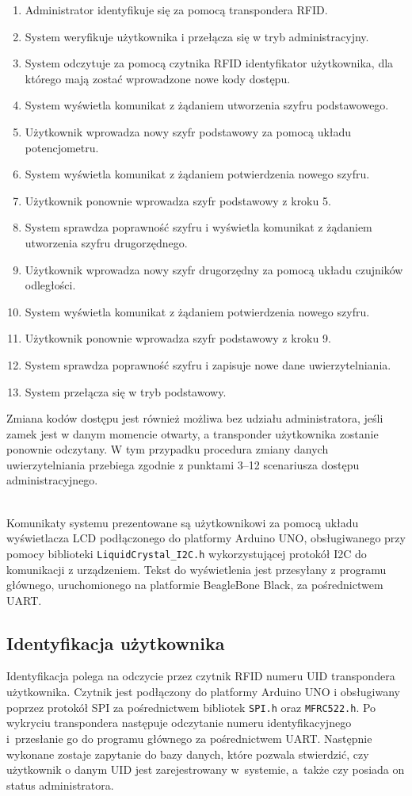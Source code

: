 \documentclass[polish,polish,a4paper]{article}
\begin{document}
	\begin{enumerate}
		\setlength\itemsep{-0.2em}
		\item Administrator identyfikuje się za pomocą transpondera RFID.
		\item System weryfikuje użytkownika i przełącza się w tryb administracyjny.
		\item System odczytuje za pomocą czytnika RFID identyfikator użytkownika, dla którego mają zostać wprowadzone nowe kody dostępu.
		\item System wyświetla komunikat z żądaniem utworzenia szyfru podstawowego.
		\item Użytkownik wprowadza nowy szyfr podstawowy za pomocą układu potencjometru.
		\item System wyświetla komunikat z żądaniem potwierdzenia nowego szyfru.
		\item Użytkownik ponownie wprowadza szyfr podstawowy z kroku 5.
		\item System sprawdza poprawność szyfru i wyświetla komunikat z żądaniem utworzenia szyfru drugorzędnego.
		\item Użytkownik wprowadza nowy szyfr drugorzędny za pomocą układu czujników odległości.
		\item System wyświetla komunikat z żądaniem potwierdzenia nowego szyfru.
		\item Użytkownik ponownie wprowadza szyfr podstawowy z kroku 9.
		\item System sprawdza poprawność szyfru i zapisuje nowe dane uwierzytelniania.
		\item System przełącza się w tryb podstawowy.
	\end{enumerate}
	Zmiana kodów dostępu jest również możliwa bez udziału administratora, jeśli zamek jest w danym momencie otwarty, a transponder użytkownika zostanie ponownie odczytany. W tym przypadku procedura zmiany danych uwierzytelniania przebiega zgodnie z punktami 3--12 scenariusza dostępu administracyjnego.
	
	\noindent\\
	Komunikaty systemu prezentowane są użytkownikowi za pomocą układu wyświetlacza LCD podłączonego do platformy Arduino UNO, obsługiwanego przy pomocy biblioteki \verb|LiquidCrystal_I2C.h| wykorzystującej protokół I2C do komunikacji z urządzeniem. Tekst do wyświetlenia jest przesyłany z programu głównego, uruchomionego na platformie BeagleBone Black, za pośrednictwem UART.
	
	\subsection{Identyfikacja użytkownika}
	Identyfikacja polega na odczycie przez czytnik RFID numeru UID transpondera użytkownika. Czytnik jest podłączony do platformy Arduino UNO i obsługiwany poprzez protokół SPI za pośrednictwem bibliotek \verb|SPI.h| oraz \verb|MFRC522.h|. Po wykryciu transpondera następuje odczytanie numeru identyfikacyjnego i~przesłanie go do programu głównego za pośrednictwem UART. Następnie wykonane zostaje zapytanie do bazy danych, które pozwala stwierdzić, czy użytkownik o danym UID jest zarejestrowany w~systemie, a~także czy posiada on status administratora.
	
\end{document}
